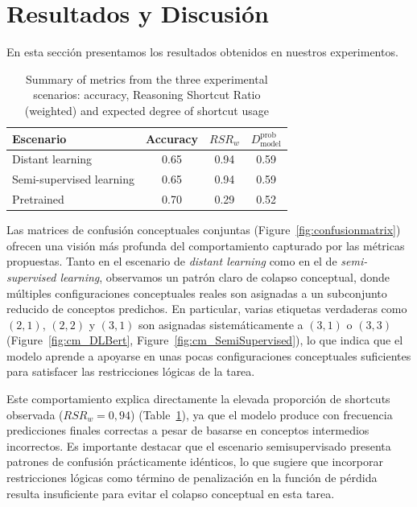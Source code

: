 \documentclass[12pt]{article}
\begin{document}
\section{Resultados y Discusión} \label{sec:results}

En esta sección presentamos los resultados obtenidos en nuestros experimentos.

\begin{table}[ht]
\centering
\begin{tabular}{lccc}
\toprule
Escenario & Accuracy & $RSR_w$ & $D^{\text{prob}}_{\text{model}}$ \\
\midrule
Distant learning & 0.65 & 0.94 & 0.59 \\
Semi-supervised learning & 0.65 & 0.94 & 0.59 \\
Pretrained & 0.70 & 0.29 & 0.52 \\
\bottomrule
\end{tabular}
\caption{Summary of metrics from the three experimental scenarios: accuracy, Reasoning Shortcut Ratio (weighted) and expected degree of shortcut usage}
\label{tab:results}
\end{table}

Las matrices de confusión conceptuales conjuntas (Figure~\ref{fig:confusionmatrix}) ofrecen una visión más profunda del comportamiento capturado por las métricas propuestas. Tanto en el escenario de \textit{distant learning} como en el de \textit{semi-supervised learning}, observamos un patrón claro de colapso conceptual, donde múltiples configuraciones conceptuales reales son asignadas a un subconjunto reducido de conceptos predichos. En particular, varias etiquetas verdaderas como $(2,1)$, $(2,2)$ y $(3,1)$ son asignadas sistemáticamente a $(3,1)$ o $(3,3)$ (Figure~\ref{fig:cm_DLBert}, Figure~\ref{fig:cm_SemiSupervised}), lo que indica que el modelo aprende a apoyarse en unas pocas configuraciones conceptuales suficientes para satisfacer las restricciones lógicas de la tarea.

Este comportamiento explica directamente la elevada proporción de shortcuts observada ($RSR_w = 0,94$) (Table~\ref{tab:results}), ya que el modelo produce con frecuencia predicciones finales correctas a pesar de basarse en conceptos intermedios incorrectos. Es importante destacar que el escenario semisupervisado presenta patrones de confusión prácticamente idénticos, lo que sugiere que incorporar restricciones lógicas como término de penalización en la función de pérdida resulta insuficiente para evitar el colapso conceptual en esta tarea.
\end{document}
